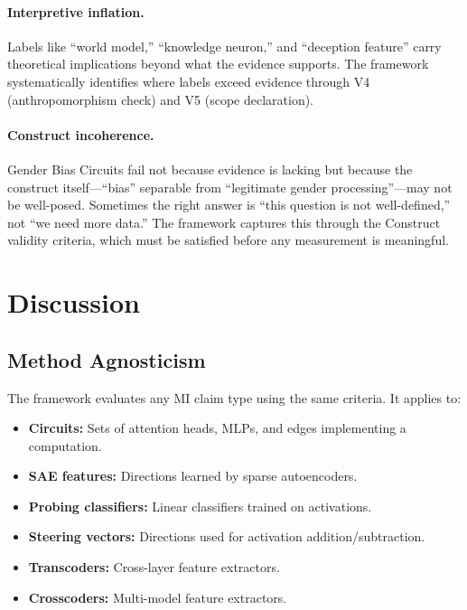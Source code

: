 \documentclass[10pt]{article}
\begin{document}
\paragraph{Interpretive inflation.} Labels like ``world model,'' ``knowledge neuron,'' and ``deception feature'' carry theoretical implications beyond what the evidence supports. The framework systematically identifies where labels exceed evidence through V4 (anthropomorphism check) and V5 (scope declaration).

\paragraph{Construct incoherence.} Gender Bias Circuits fail not because evidence is lacking but because the construct itself---``bias'' separable from ``legitimate gender processing''---may not be well-posed. Sometimes the right answer is ``this question is not well-defined,'' not ``we need more data.'' The framework captures this through the Construct validity criteria, which must be satisfied before any measurement is meaningful.

\section{Discussion}
\label{sec:discussion}

\subsection{Method Agnosticism}

The framework evaluates any MI claim type using the same criteria. It applies to:

\begin{itemize}[nosep]
    \item \textbf{Circuits:} Sets of attention heads, MLPs, and edges implementing a computation.
    \item \textbf{SAE features:} Directions learned by sparse autoencoders.
    \item \textbf{Probing classifiers:} Linear classifiers trained on activations.
    \item \textbf{Steering vectors:} Directions used for activation addition/subtraction.
    \item \textbf{Transcoders:} Cross-layer feature extractors.
    \item \textbf{Crosscoders:} Multi-model feature extractors.
\end{itemize}
\end{document}
